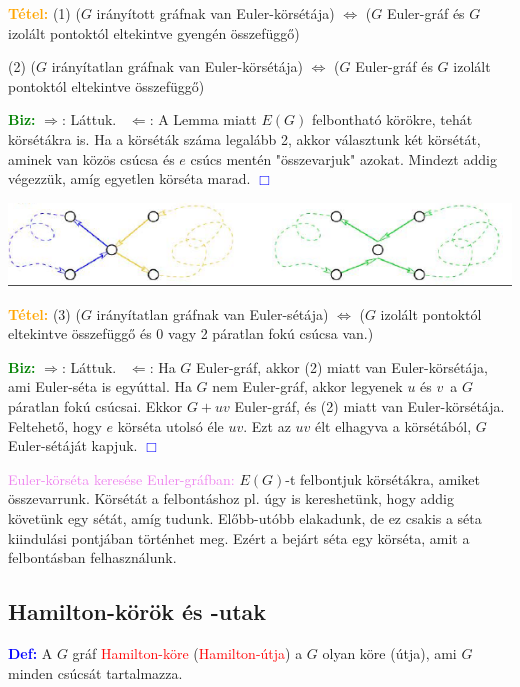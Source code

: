 \documentclass[../szamtud.tex]{subfiles}
\begin{document}
        \textcolor{orange}{\textbf{Tétel:}} (1) ($G$ irányított gráfnak van Euler-körsétája) $\Longleftrightarrow$ ($G$ Euler-gráf és $G$ izolált pontoktól eltekintve gyengén összefüggő) 
        
        (2) ($G$ irányítatlan gráfnak van Euler-körsétája) $\Longleftrightarrow$ ($G$ Euler-gráf és $G$ izolált pontoktól eltekintve összefüggő)

        \textcolor{green}{\textbf{Biz:}} $\Rightarrow$: Láttuk. \checkmark $\Leftarrow$: A Lemma miatt $E(G)$ felbontható körökre, tehát körsétákra is. Ha a körséták száma legalább 2, akkor választunk két körsétát, aminek van közös csúcsa és $e$ csúcs mentén "összevarjuk" azokat. Mindezt addig végezzük, amíg egyetlen körséta marad.  \textcolor{blue}{$\Box$}

        \includegraphics[width=\textwidth]{./img/3.png}

        \textcolor{orange}{\textbf{Tétel:}} (3) ($G$ irányítatlan gráfnak van Euler-sétája) $\Longleftrightarrow$ ($G$ izolált pontoktól eltekintve összefüggő és 0 vagy 2 páratlan fokú csúcsa van.)

        \textcolor{green}{\textbf{Biz:}} $\Rightarrow$: Láttuk. \checkmark $\Leftarrow$: Ha $G$ Euler-gráf, akkor (2) miatt van Euler-körsétája, ami Euler-séta is egyúttal. Ha $G$ nem Euler-gráf, akkor legyenek $u$ és $v$ a $G$ páratlan fokú csúcsai. Ekkor $G + uv$ Euler-gráf, és (2) miatt van Euler-körsétája. Feltehető, hogy $e$ körséta utolsó éle $uv$. Ezt az $uv$ élt elhagyva a körsétából, $G$ Euler-sétáját kapjuk. \textcolor{blue}{$\Box$}

        \textcolor{violet}{Euler-körséta keresése Euler-gráfban:} $E(G)$-t felbontjuk körsétákra, amiket összevarrunk. Körsétát a felbontáshoz pl. úgy is kereshetünk, hogy addig követünk egy sétát, amíg tudunk. Előbb-utóbb elakadunk, de ez csakis a séta kiindulási pontjában történhet meg. Ezért a bejárt séta egy körséta, amit a felbontásban felhasználunk.

    \subsection{Hamilton-körök és -utak} 

        \textcolor{blue}{\textbf{Def:}} A $G$ gráf \textcolor{red}{Hamilton-köre} (\textcolor{red}{Hamilton-útja}) a $G$ olyan köre (útja), ami $G$ minden csúcsát tartalmazza. 
\end{document}
